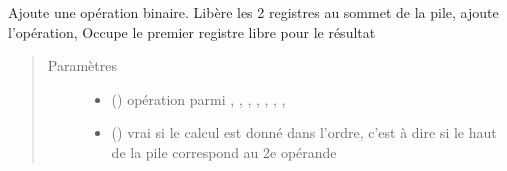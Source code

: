 \documentclass[letterpaper,10pt,french]{sphinxmanual}
\begin{document}
\begin{fulllineitems}
\begin{fulllineitems}
\label{\detokenize{compileexpressionmanager:compileexpressionmanager.CompileExpressionManager.pushBinaryOperator}}
Ajoute une opération binaire.
Libère les 2 registres au sommet de la pile, ajoute l’opération,
Occupe le premier registre libre pour le résultat
\begin{quote}\begin{description}
\item[{Paramètres}] \leavevmode\begin{itemize}
\item {} 
 () \textendash{} opération parmi \sphinxcode{\sphinxupquote{+}}, \sphinxcode{\sphinxupquote{\sphinxhyphen{}}}, \sphinxcode{\sphinxupquote{*}}, \sphinxcode{\sphinxupquote{/}}, \sphinxcode{\sphinxupquote{\%}}, \sphinxcode{\sphinxupquote{\&}}, \sphinxcode{\sphinxupquote{|}}, \sphinxcode{\sphinxupquote{\textasciicircum{}}}

\item {} 
 () \textendash{} vrai si le calcul est donné dans l’ordre, c’est à dire si le haut de la pile correspond au 2e opérande

\end{itemize}

\end{description}\end{quote}

\end{fulllineitems}



\end{fulllineitems}
\end{document}
